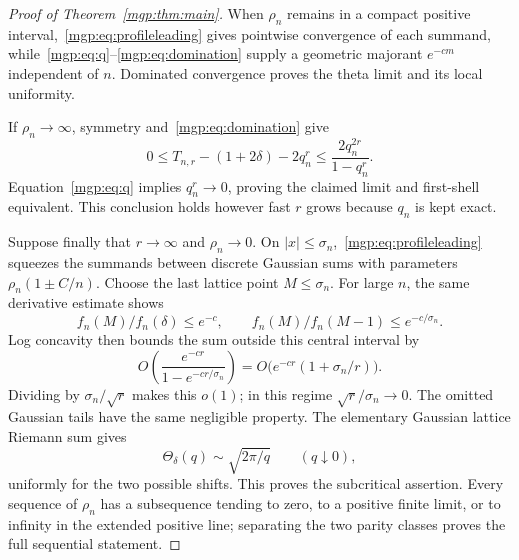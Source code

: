 \documentclass[11pt]{article}
\begin{document}
\begin{proof}[Proof of Theorem~\ref{mgp:thm:main}]
When $\rho_n$ remains in a compact positive interval,~\eqref{mgp:eq:profileleading} gives pointwise convergence of each summand, while~\eqref{mgp:eq:q}--\eqref{mgp:eq:domination} supply a geometric majorant $e^{-cm}$ independent of $n$. Dominated convergence proves the theta limit and its local uniformity.

If $\rho_n\to\infty$, symmetry and~\eqref{mgp:eq:domination} give
\begin{equation}\label{mgp:eq:firstshell}
 0\le T_{n,r}-(1+2\delta)-2q_n^r
 \le\frac{2q_n^{2r}}{1-q_n^r}.
\end{equation}
Equation~\eqref{mgp:eq:q} implies $q_n^r\to0$, proving the claimed limit and first-shell equivalent. This conclusion holds however fast $r$ grows because $q_n$ is kept exact.

Suppose finally that $r\to\infty$ and $\rho_n\to0$. On $|x|\le\sigma_n$,~\eqref{mgp:eq:profileleading} squeezes the summands between discrete Gaussian sums with parameters $\rho_n(1\pm C/n)$. Choose the last lattice point $M\le\sigma_n$. For large $n$, the same derivative estimate shows
\[
 f_n(M)/f_n(\delta)\le e^{-c},\qquad
 f_n(M)/f_n(M-1)\le e^{-c/\sigma_n}.
\]
Log concavity then bounds the sum outside this central interval by
\[
 O\left(\frac{e^{-cr}}{1-e^{-cr/\sigma_n}}\right)
 =O\bigl(e^{-cr}(1+\sigma_n/r)\bigr).
\]
Dividing by $\sigma_n/\sqrt r$ makes this $o(1)$; in this regime $\sqrt r/\sigma_n\to0$. The omitted Gaussian tails have the same negligible property. The elementary Gaussian lattice Riemann sum gives
\[
 \Theta_\delta(q)\sim\sqrt{2\pi/q}\qquad(q\downarrow0),
\]
uniformly for the two possible shifts. This proves the subcritical assertion. Every sequence of $\rho_n$ has a subsequence tending to zero, to a positive finite limit, or to infinity in the extended positive line; separating the two parity classes proves the full sequential statement.
\end{proof}
\end{document}
